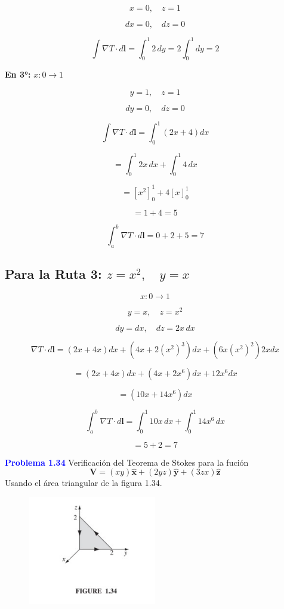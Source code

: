 \documentclass{article}
\newcommand{\question}[1]{\textcolor{blue}{\textbf{#1}}}
\begin{document}
\[
x = 0, \quad z = 1
\]

\[
dx = 0, \quad dz = 0
\]

\[
\int \nabla T \cdot d\mathbf{l} = \int_0^1 2 \, dy = 2 \int_0^1 dy = 2
\]

\textbf{En 3°:} \( x: 0 \to 1 \)

\[
y = 1, \quad z = 1
\]

\[
dy = 0, \quad dz = 0
\]

\[
\int \nabla T \cdot d\mathbf{l} = \int_0^1 (2x + 4)dx
\]

\[
= \int_0^1 2x \, dx + \int_0^1 4 \, dx
\]

\[
= \left[ x^2 \right]_0^1 + 4 \left[ x \right]_0^1
\]

\[
= 1 + 4 = 5
\]

\[
\int_a^b \nabla T \cdot d\mathbf{l} = 0 + 2 + 5 = \boxed{7}
\]

\subsection*{Para la Ruta 3: \( z = x^2, \quad y = x \)}

\[
x: 0 \to 1
\]

\[
y = x, \quad z = x^2
\]

\[
dy = dx, \quad dz = 2x \, dx
\]

\[
\nabla T \cdot d\mathbf{l} = (2x + 4x)dx + (4x + 2(x^2)^3)dx + (6x(x^2)^2)2x dx
\]

\[
= (2x + 4x)dx + (4x + 2x^6)dx + 12x^6 dx
\]

\[
= (10x + 14x^6)dx
\]

\[
\int_a^b \nabla T \cdot d\mathbf{l} = \int_0^1 10x \, dx + \int_0^1 14x^6 \, dx
\]

\[
= 5 + 2 = \boxed{7}
\]

\question{Problema  1.34}
Verificación del Teorema de Stokes para la fución 
\[
\mathbf{V} = (xy) \hat{\mathbf{x}} + (2yz) \hat{\mathbf{y}} + (3zx) \hat{\mathbf{z}}
\] Usando el área triangular de la figura 1.34.
\begin{figure}[h!] 
    \centering
    \includegraphics[width=0.5\textwidth]{1.34.jpg} 
    \label{fig:mi_figura}
\end{figure}
\end{document}
